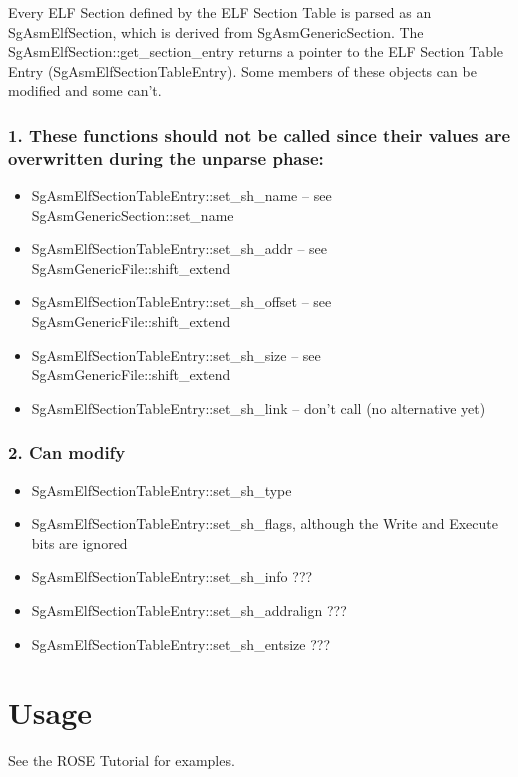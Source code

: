 Every ELF Section defined by the ELF Section Table is parsed as an SgAsmElfSection, which is derived from SgAsmGenericSection.
The SgAsmElfSection::get\_section\_entry returns a pointer to the ELF Section Table Entry (SgAsmElfSectionTableEntry). Some
members of these objects can be modified and some can't.

\subsubsection{1. These functions should not be called since their values are overwritten during the unparse phase:}

\begin{itemize}
   \item SgAsmElfSectionTableEntry::set\_sh\_name   -- see SgAsmGenericSection::set\_name
   \item SgAsmElfSectionTableEntry::set\_sh\_addr   -- see SgAsmGenericFile::shift\_extend
   \item SgAsmElfSectionTableEntry::set\_sh\_offset -- see SgAsmGenericFile::shift\_extend
   \item SgAsmElfSectionTableEntry::set\_sh\_size   -- see SgAsmGenericFile::shift\_extend
   \item SgAsmElfSectionTableEntry::set\_sh\_link   -- don't call (no alternative yet)
\end{itemize}
   
\subsubsection{2. Can modify}


\begin{itemize}
   \item SgAsmElfSectionTableEntry::set\_sh\_type
   \item SgAsmElfSectionTableEntry::set\_sh\_flags, although the Write and Execute bits are ignored
   \item SgAsmElfSectionTableEntry::set\_sh\_info   ???
   \item SgAsmElfSectionTableEntry::set\_sh\_addralign ???
   \item SgAsmElfSectionTableEntry::set\_sh\_entsize ???
\end{itemize}






\section{Usage}
     See the ROSE Tutorial for examples.



